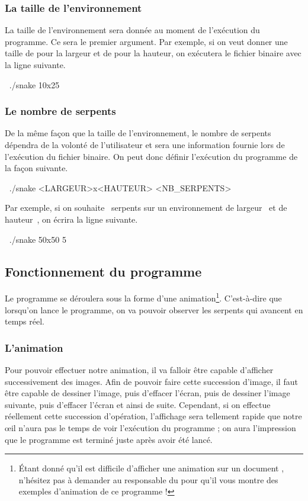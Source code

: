 \documentclass[a4paper]{article}
\begin{document}
			\subsubsection{La taille de l'environnement}
				La taille de l'environnement sera donnée au moment de l'exécution du programme.
				Ce sera le premier argument.
				Par exemple, si on veut donner une taille de  pour la largeur et de  pour la hauteur, on exécutera le fichier binaire avec la ligne suivante.
				\begin{Code*}
$~$ ./snake 10x25
				\end{Code*}

			\subsubsection{Le nombre de serpents}
				De la même façon que la taille de l'environnement, le nombre de serpents dépendra de la volonté de l'utilisateur et sera une information fournie lors de l'exécution du fichier binaire.
				On peut donc définir l'exécution du programme de la façon suivante.
				\begin{Code*}
$~$ ./snake <LARGEUR>x<HAUTEUR> <NB_SERPENTS>
				\end{Code*}
				Par exemple, si on souhaite ~serpents sur un environnement de largeur~ et de hauteur~, on écrira la ligne suivante.
				\begin{Code*}
$~$ ./snake 50x50 5
				\end{Code*}

		\subsection{Fonctionnement du programme}
			Le programme se déroulera sous la forme d'une animation\footnote{Étant donné qu'il est difficile d'afficher une animation sur un document , n'hésitez pas à demander au responsable du  pour qu'il vous montre des exemples d'animation de ce programme !}.
			C'est-à-dire que lorsqu'on lance le programme, on va pouvoir observer les serpents qui avancent en temps réel.
			\subsubsection{L'animation}
				Pour pouvoir effectuer notre animation, il va falloir être capable d'afficher successivement des images.
				Afin de pouvoir faire cette succession d'image, il faut être capable de dessiner l'image, puis d'effacer l'écran, puis de dessiner l'image suivante, puis d'effacer l'écran et ainsi de suite.
				Cependant, si on effectue réellement cette succession d'opération, l'affichage sera tellement rapide que notre œil n'aura pas le temps de voir l'exécution du programme ; on aura l'impression que le programme est terminé juste après avoir été lancé.
\end{document}
